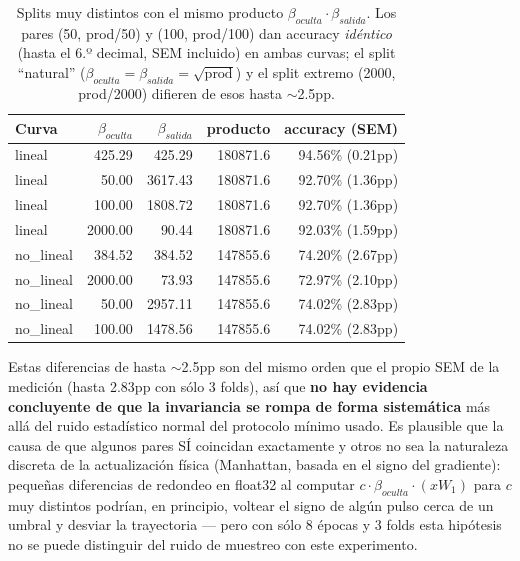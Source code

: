 \documentclass[11pt]{article}
\begin{document}
\begin{table}[htbp]\centering\begin{tabular}{@{}lrrrr@{}}\toprule

Curva & $\beta_{oculta}$ & $\beta_{salida}$ & producto & accuracy (SEM) \\ \midrule

lineal & 425.29 & 425.29 & 180871.6 & 94.56\% (0.21pp) \\

lineal & 50.00 & 3617.43 & 180871.6 & 92.70\% (1.36pp) \\

lineal & 100.00 & 1808.72 & 180871.6 & 92.70\% (1.36pp) \\

lineal & 2000.00 & 90.44 & 180871.6 & 92.03\% (1.59pp) \\

no\_lineal & 384.52 & 384.52 & 147855.6 & 74.20\% (2.67pp) \\

no\_lineal & 2000.00 & 73.93 & 147855.6 & 72.97\% (2.10pp) \\

no\_lineal & 50.00 & 2957.11 & 147855.6 & 74.02\% (2.83pp) \\

no\_lineal & 100.00 & 1478.56 & 147855.6 & 74.02\% (2.83pp) \\

\bottomrule\end{tabular}

\caption{Splits muy distintos con el mismo producto $\beta_{oculta}\cdot\beta_{salida}$. Los pares (50, prod/50) y (100, prod/100) dan accuracy \emph{idéntico} (hasta el 6.º decimal, SEM incluido) en ambas curvas; el split ``natural'' ($\beta_{oculta}=\beta_{salida}=\sqrt{\text{prod}}$) y el split extremo (2000, prod/2000) difieren de esos hasta $\sim$2.5pp.}

\end{table}

Estas diferencias de hasta $\sim$2.5pp son del mismo orden que el propio SEM de la medición (hasta 2.83pp con sólo 3 folds), así que \textbf{no hay evidencia concluyente de que la invariancia se rompa de forma sistemática} más allá del ruido estadístico normal del protocolo mínimo usado. Es plausible que la causa de que algunos pares SÍ coincidan exactamente y otros no sea la naturaleza discreta de la actualización física (Manhattan, basada en el signo del gradiente): pequeñas diferencias de redondeo en float32 al computar $c\cdot\beta_{oculta}\cdot(xW_1)$ para $c$ muy distintos podrían, en principio, voltear el signo de algún pulso cerca de un umbral y desviar la trayectoria — pero con sólo 8 épocas y 3 folds esta hipótesis no se puede distinguir del ruido de muestreo con este experimento.
\end{document}
